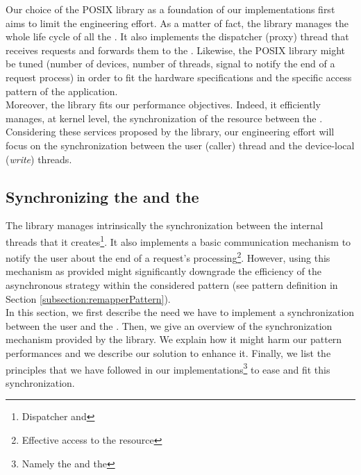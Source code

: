 		Our choice of the POSIX \notationaioShort\space library as a foundation of our implementations first aims to limit the engineering effort.   As a matter of fact, the \notationaioShort\space library manages the whole life cycle of all the \notationaioWriteThreads.   It also implements the dispatcher (proxy) thread that receives \notationIO\space requests and forwards them to the \notationaioWriteThreads.   Likewise, the POSIX \notationaioShort\space library might be tuned (number of \notationIO\space devices, number of threads, signal to notify the end of a request process) in order to fit the hardware specifications and the specific \notationIO\space access pattern of the application.\\
		Moreover, the \notationaioShort\space library fits our performance objectives.   Indeed, it efficiently manages, at kernel level, the synchronization of the \notationIO\space resource between the \notationaioWriteThreads.\\
		Considering these services proposed by the \notationaioShort\space library, our engineering effort will focus on the synchronization between the user (caller) thread and the \notationIO\space device-local (\emph{write}) threads.


	\subsection{Synchronizing the \notationaioComputeThread\space and the \notationaioWriteThreads} \label{subsection:synchronization}
		The \notationaioShort\space library manages intrinsically the synchronization between the internal threads that it creates\footnote{Dispatcher and \notationaioWriteThreads}.   It also implements a basic communication mechanism to notify the user about the end of a request's processing\footnote{Effective access to the \notationIO\space resource}.   However, using this mechanism as provided might significantly downgrade the efficiency of the asynchronous strategy within the considered \notationIO\space pattern (see pattern definition in Section \ref{subsection:remapperPattern}).\\
		In this section, we first describe the need we have to implement a synchronization between the user and the \notationaioWriteThreads.   Then, we give an overview of the synchronization mechanism provided by the \notationaioShort\space library.   We explain how it might harm our pattern performances and we describe our solution to enhance it.   Finally, we list the principles that we have followed in our implementations\footnote{Namely the \toolSimulationSoftware\space and the \toolTargetSoftware} to ease and fit this synchronization.\\

